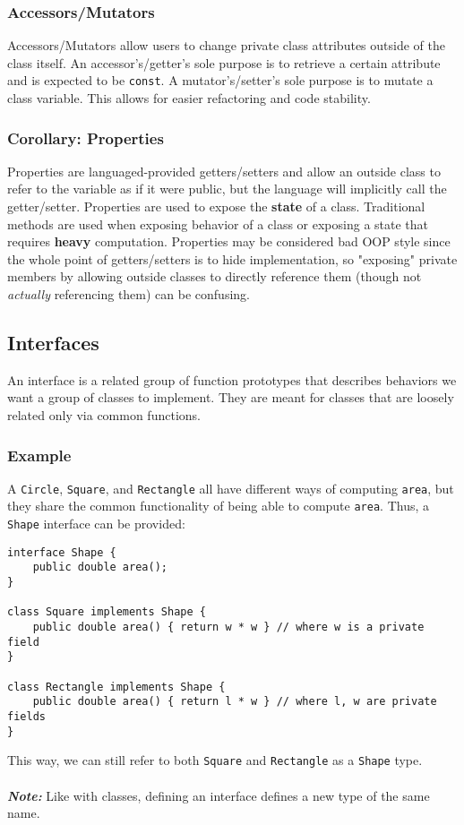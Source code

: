 \documentclass{article}
\begin{document}
\subsubsection{Accessors/Mutators}
Accessors/Mutators allow users to change private class attributes
outside of the class itself. An accessor's/getter's sole purpose is to retrieve
a certain attribute and is expected to be \texttt{const}. A
mutator's/setter's sole purpose is to mutate a class variable. This
allows for easier refactoring and code stability.

\subsubsection*{Corollary: Properties}
Properties are languaged-provided getters/setters and allow an outside
class to refer to the variable as if it were public, but the language
will implicitly call the getter/setter. Properties are used to expose
the \textbf{state} of a class. Traditional methods are used when
exposing behavior of a class or exposing a state that requires
\textbf{heavy} computation. Properties may be considered bad OOP style
since the whole point of getters/setters is to hide implementation, so
"exposing" private members by allowing outside classes to directly
reference them (though not \textit{actually} referencing them) can be confusing.


\subsection{Interfaces}
An interface is a related group of function prototypes that describes
behaviors we want a group of classes to implement. They are meant for
classes that are loosely related only via common functions.

\subsubsection*{Example}
A \texttt{Circle}, \texttt{Square}, and \texttt{Rectangle} all have
different ways of computing \texttt{area}, but they share the common
functionality of being able to compute \texttt{area}. Thus, a
\texttt{Shape} interface can be provided:
\begin{verbatim}
interface Shape {
    public double area();
}

class Square implements Shape {
    public double area() { return w * w } // where w is a private field
}

class Rectangle implements Shape {
    public double area() { return l * w } // where l, w are private fields
}
\end{verbatim}
This way, we can still refer to both \texttt{Square} and
\texttt{Rectangle} as a \texttt{Shape} type. \\ \\
\textit{\textbf{Note:}} Like with classes, defining an interface
defines a new type of the same name.
\end{document}
